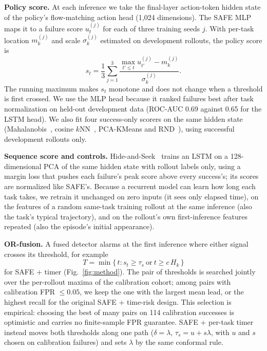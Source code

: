 \documentclass[10pt,a4paper,twocolumn]{article}
\begin{document}
\textbf{Policy score.} At each inference we take the final-layer action-token hidden state
of the policy's flow-matching action head (1,024 dimensions). The SAFE
MLP~\cite{gu2025safe} maps it to a failure score $u^{(j)}_t$ for each of three training seeds
$j$. With per-task location $m^{(j)}_k$ and scale $\sigma^{(j)}_k$ estimated on development
rollouts, the policy score is
\begin{equation}
  s_t = \frac{1}{3}\sum_{j=1}^{3} \frac{\max_{t' \le t} u^{(j)}_{t'} - m^{(j)}_k}{\sigma^{(j)}_k}.
\end{equation}
The running maximum makes $s_t$ monotone and does not change when a threshold is first
crossed. We use the MLP head because it ranked failures best after task normalization on
held-out development data (ROC-AUC 0.69 against 0.65 for the LSTM head). We also fit four success-only scorers on the same hidden state
(Mahalanobis~\cite{lee2018mahalanobis}, cosine $k$NN~\cite{sun2022knn}, PCA-KMeans and
RND~\cite{burda2019rnd}), using successful development rollouts only.

\textbf{Sequence score and controls.} Hide-and-Seek~\cite{park2026hideseek} trains an LSTM on
a 128-dimensional PCA of the same hidden state with rollout labels only, using a margin loss
that pushes each failure's peak score above every success's; its scores are normalized like
SAFE's. Because a recurrent model can learn how long each task takes, we retrain it unchanged
on zero inputs (it sees only elapsed time), on the features of a random same-task training
rollout at the same inference (also the task's typical trajectory), and on the rollout's own
first-inference features repeated (also the episode's initial appearance).

\textbf{OR-fusion.} A fused detector alarms at the first inference where either signal
crosses its threshold, for example
\begin{equation}
  T = \min\{\, t : s_t \ge \tau_s \ \text{or}\ t \ge c\,H_k \,\}
\end{equation}
for SAFE + timer (Fig.~\ref{fig:method}). The pair of thresholds is searched jointly over the
per-rollout maxima of the calibration cohort; among pairs with calibration FPR $\le 0.05$,
we keep the one with the largest mean lead, or the highest recall for the original SAFE +
time-risk design. This selection is empirical: choosing the best of many pairs on 114
calibration successes is optimistic and carries no finite-sample FPR guarantee. SAFE +
per-task timer instead moves both thresholds along one path ($\delta = \lambda$,
$\tau_s = u + s\lambda$, with $u$ and $s$ chosen on calibration failures) and sets $\lambda$ by
the same conformal rule.
\end{document}
